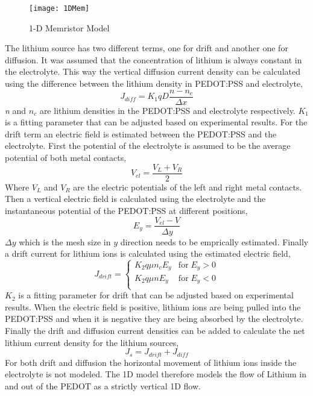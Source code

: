 \begin{doublespace}
 
\begin{figure}[!htp]
\centering
\texttt{[image: 1DMem]}
\caption{1-D Memristor Model} 
\label{MemStc15}
\end{figure}


The lithium source has two different terms, one for drift and another one for diffusion. It was assumed that the concentration of lithium is always constant in the electrolyte. This way the vertical diffusion current density can be calculated using the difference between the lithium density in PEDOT:PSS and electrolyte,
\begin{equation}
J_{diff} = K_1 q D  \frac{n - n_c}{\Delta x}
\end{equation}
\textit{n} and \textit{$n_c$} are lithium densities in the PEDOT:PSS and electrolyte respectively. \textit{$K_1$} is a fitting parameter that can be adjusted based on experimental results. For the drift term an electric field is estimated between the PEDOT:PSS and the electrolyte. First the potential of the electrolyte is assumed to be the average potential of both metal contacts, 
\begin{equation}
V_{el} =  \frac{V_L+V_R}{2}
\end{equation}
Where $V_L $ and $V_R$ are the electric potentials of the left and right metal contacts. Then a vertical electric field is calculated using the electrolyte and the instantaneous potential of the PEDOT:PSS at different positions, 
\begin{equation}
E_{y} =  \frac{V_{el}-V }{\Delta y}
\end{equation}
$\Delta y$ which is the mesh size in $y$ direction needs to be emprically estimated. Finally a drift current for lithium ions is calculated using the estimated electric field, 
\begin{equation}
J_{drift} = \begin{cases}
        K_2 q \mu n_c E_y  & \text{for} \;  E_y>0  \\
        K_2 q \mu n E_y   &  \text{for} \;  E_y<0  \\
     \end{cases}
\end{equation}
\textit{$K_2$} is a fitting parameter for drift that can be adjusted based on experimental results. When the electric field is positive, lithium ions are being pulled into the PEDOT:PSS and when it is negative they are being absorbed by the electrolyte. Finally the drift and diffusion current densities can be added to calculate the net lithium current density for the lithium sources,
\begin{equation}
J_{s} =  J_{drift}+J_{diff}
\end{equation}
For both drift and diffusion the horizontal movement of lithium ions inside the electrolyte is not modeled. The 1D model therefore models the flow of Lithium in and out of the PEDOT as a strictly vertical 1D flow.



\end{doublespace}
